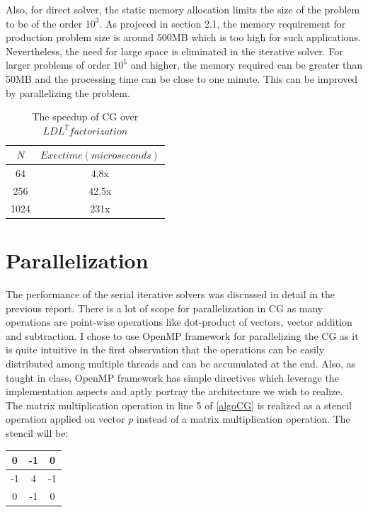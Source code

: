\documentclass{article}
\begin{document}
\begin{spacing}{1.1}
Also, for direct solver, the static memory allocation limits the size of the problem to be of the order $10^3$. As projeced in section 2.1, the memory requirement for production problem size is around 500MB which is too high for such applications. Nevertheless, the need for large space is eliminated in the iterative solver. For larger problems of order $10^5$ and higher, the memory required can be greater than 50MB and the processing time can be close to one minute. This can be improved by parallelizing the problem.

\begin{table}[H]
\begin{center}
 \begin{tabular}{| c | c |} 
 \hline
$N$ & $Exec time (microseconds)$  \\ %
 \hline
64 & 4.8x \\ %
256 & 42.5x \\ %
1024 &  231x \\ %
 \hline
\end{tabular}%
\end{center}
\caption{\label{speedup} The speedup of CG over $LDL^T factorization$  } 
\end{table}


\section{Parallelization}

    The performance of the serial iterative solvers was discussed in detail in the previous report. There is a lot of scope for parallelization in CG as many operations are point-wise operations like dot-product of vectors, vector addition and subtraction. I chose to use OpenMP framework for parallelizing the CG as it is quite intuitive in the first observation that the operations can be easily distributed among multiple threads and can be accumulated at the end. Also, as taught in class, OpenMP framework has simple directives which leverage the implementation aspects and aptly portray the architecture we wish to realize. The matrix multiplication operation in line 5 of \ref{algoCG} is realized as a stencil operation applied on vector $p$ instead of a matrix multiplication operation. The stencil will be:
\begin{tabular}{|c|c|c|}
\hline
0 & -1 & 0\\ \hline
-1 & 4 & -1 \\ \hline
0 & -1 & 0 \\ \hline
\end{tabular}


\end{spacing}
\end{document}
